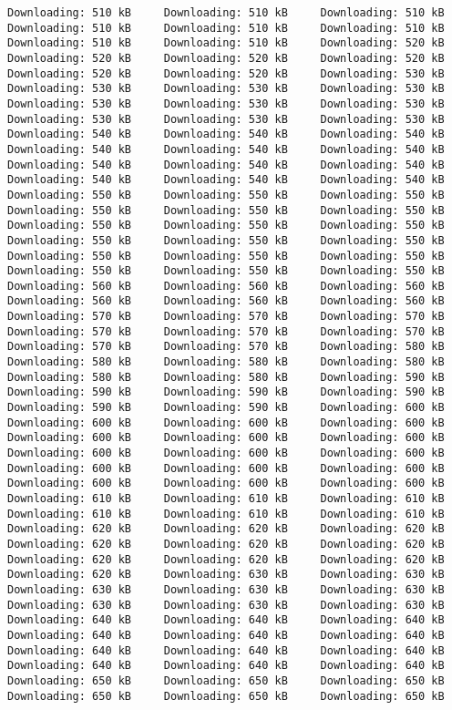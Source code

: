 \documentclass[
  12pt,
  portuguese,
]{report}
\begin{document}
\begin{verbatim}
Downloading: 510 kB     Downloading: 510 kB     Downloading: 510 kB     Downloading: 510 kB     Downloading: 510 kB     Downloading: 510 kB     Downloading: 510 kB     Downloading: 510 kB     Downloading: 520 kB     Downloading: 520 kB     Downloading: 520 kB     Downloading: 520 kB     Downloading: 520 kB     Downloading: 520 kB     Downloading: 530 kB     Downloading: 530 kB     Downloading: 530 kB     Downloading: 530 kB     Downloading: 530 kB     Downloading: 530 kB     Downloading: 530 kB     Downloading: 530 kB     Downloading: 530 kB     Downloading: 530 kB     Downloading: 540 kB     Downloading: 540 kB     Downloading: 540 kB     Downloading: 540 kB     Downloading: 540 kB     Downloading: 540 kB     Downloading: 540 kB     Downloading: 540 kB     Downloading: 540 kB     Downloading: 540 kB     Downloading: 540 kB     Downloading: 540 kB     Downloading: 550 kB     Downloading: 550 kB     Downloading: 550 kB     Downloading: 550 kB     Downloading: 550 kB     Downloading: 550 kB     Downloading: 550 kB     Downloading: 550 kB     Downloading: 550 kB     Downloading: 550 kB     Downloading: 550 kB     Downloading: 550 kB     Downloading: 550 kB     Downloading: 550 kB     Downloading: 550 kB     Downloading: 550 kB     Downloading: 550 kB     Downloading: 550 kB     Downloading: 560 kB     Downloading: 560 kB     Downloading: 560 kB     Downloading: 560 kB     Downloading: 560 kB     Downloading: 560 kB     Downloading: 570 kB     Downloading: 570 kB     Downloading: 570 kB     Downloading: 570 kB     Downloading: 570 kB     Downloading: 570 kB     Downloading: 570 kB     Downloading: 570 kB     Downloading: 580 kB     Downloading: 580 kB     Downloading: 580 kB     Downloading: 580 kB     Downloading: 580 kB     Downloading: 580 kB     Downloading: 590 kB     Downloading: 590 kB     Downloading: 590 kB     Downloading: 590 kB     Downloading: 590 kB     Downloading: 590 kB     Downloading: 600 kB     Downloading: 600 kB     Downloading: 600 kB     Downloading: 600 kB     Downloading: 600 kB     Downloading: 600 kB     Downloading: 600 kB     Downloading: 600 kB     Downloading: 600 kB     Downloading: 600 kB     Downloading: 600 kB     Downloading: 600 kB     Downloading: 600 kB     Downloading: 600 kB     Downloading: 600 kB     Downloading: 600 kB     Downloading: 610 kB     Downloading: 610 kB     Downloading: 610 kB     Downloading: 610 kB     Downloading: 610 kB     Downloading: 610 kB     Downloading: 620 kB     Downloading: 620 kB     Downloading: 620 kB     Downloading: 620 kB     Downloading: 620 kB     Downloading: 620 kB     Downloading: 620 kB     Downloading: 620 kB     Downloading: 620 kB     Downloading: 620 kB     Downloading: 630 kB     Downloading: 630 kB     Downloading: 630 kB     Downloading: 630 kB     Downloading: 630 kB     Downloading: 630 kB     Downloading: 630 kB     Downloading: 630 kB     Downloading: 640 kB     Downloading: 640 kB     Downloading: 640 kB     Downloading: 640 kB     Downloading: 640 kB     Downloading: 640 kB     Downloading: 640 kB     Downloading: 640 kB     Downloading: 640 kB     Downloading: 640 kB     Downloading: 640 kB     Downloading: 640 kB     Downloading: 650 kB     Downloading: 650 kB     Downloading: 650 kB     Downloading: 650 kB     Downloading: 650 kB     Downloading: 650 kB     
\end{verbatim}
\end{document}

